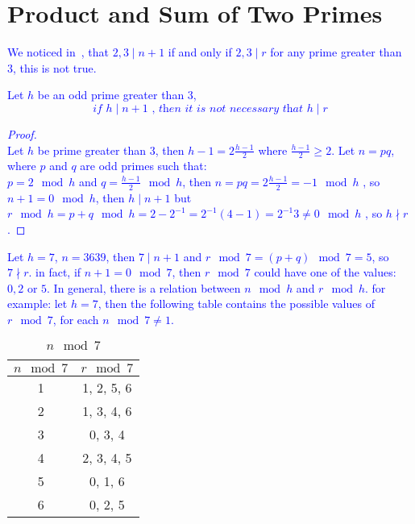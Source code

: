 \documentclass{article}
\begin{document}
\section{Product and Sum of Two Primes}\label{sec:1}
\textcolor{blue}{
We noticed in~\cite{Mohammed2017}, that $2,3 \mid n+1$ if and only if $2,3 \mid r$ for any prime greater than 3, this is not true.
\begin{proposition}\label{prop:a}
Let $h$ be an odd prime greater than 3,
\begin{equation*}
\textit{if $h \mid n+1$ , then it is not necessary that } h \mid r
\end{equation*}
\end{proposition}
\begin{proof}
~\\
Let $h$ be prime greater than $3$, then $h-1 = 2\frac{h-1}{2} $ where $\frac{h-1}{2} \geq 2$.
Let $n = pq$, where $p$ and $q$ are odd primes such that:\\
$p = 2 \mod h$ and $q = \frac{h-1}{2} \mod h$, then $n = pq = 2 \frac{h-1}{2} = -1 \mod h$
, so $n+1 = 0 \mod h$, then $h \mid n+1$
but $r \mod h = p + q \mod h = 2 - 2^{-1} = 2^{-1}(4-1)=2^{-1}3 \neq 0  \mod h$ , so $h \nmid r$.
\end{proof}
Let $h=7$, $n=3639$, then $7 \mid n+1$ and $r \mod 7 = (p+q) \mod 7 = 5$, so $7 \nmid r$. in fact, if $n+1 = 0 \mod 7$, then $r \mod 7$ could have one of the values: $0,2$ or $5$.
In general, there is a relation between $n \mod h$ and $r \mod h$.
for example:
let $h=7$, then the following table contains the possible values of $r \mod 7$, for each $n \mod 7 \neq 1$.
\begin{table}[H]
\centering
\caption{$n \mod 7$}
\label{table:a}
\begin{tabular}{|c|c|}
\hline
$n \mod 7$          & $r \mod 7$		\\ \hline
1 & 1, 2, 5, 6		\\ \hline
2 & 1, 3, 4, 6		\\ \hline
3 & 0, 3, 4		\\ \hline
4 & 2, 3, 4, 5		\\ \hline
5 & 0, 1, 6		\\ \hline
6 & 0, 2, 5		\\ \hline
\end{tabular}

\end{table}}
\end{document}
